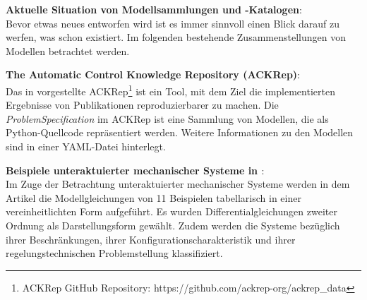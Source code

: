 \textbf{Aktuelle Situation von Modellsammlungen und -Katalogen}: \\
Bevor etwas neues entworfen wird ist es immer sinnvoll einen Blick darauf zu werfen, was schon existiert. Im folgenden bestehende Zusammenstellungen von Modellen betrachtet werden.

\textbf{The Automatic Control Knowledge Repository (ACKRep)}:\\
Das in \cite{KNHE20a} vorgestellte ACKRep\footnote{ACKRep GitHub Repository: https://github.com/ackrep-org/ackrep\_data} ist ein Tool, mit dem Ziel die implementierten Ergebnisse von Publikationen reproduzierbarer zu machen. Die \textit{ProblemSpecification} im ACKRep ist eine Sammlung von Modellen, die als Python-Quellcode repräsentiert werden. Weitere Informationen zu den Modellen sind in einer YAML-Datei hinterlegt. 

\textbf{Beispiele unteraktuierter mechanischer Systeme in \cite{LIYU13}}:\\
Im Zuge der Betrachtung unteraktuierter mechanischer Systeme werden in dem Artikel die Modellgleichungen von 11 Beispielen tabellarisch in einer vereinheitlichten Form aufgeführt. Es wurden Differentialgleichungen zweiter Ordnung als Darstellungsform gewählt. Zudem werden die Systeme bezüglich ihrer Beschränkungen, ihrer Konfigurationscharakteristik und ihrer regelungstechnischen Problemstellung klassifiziert.

